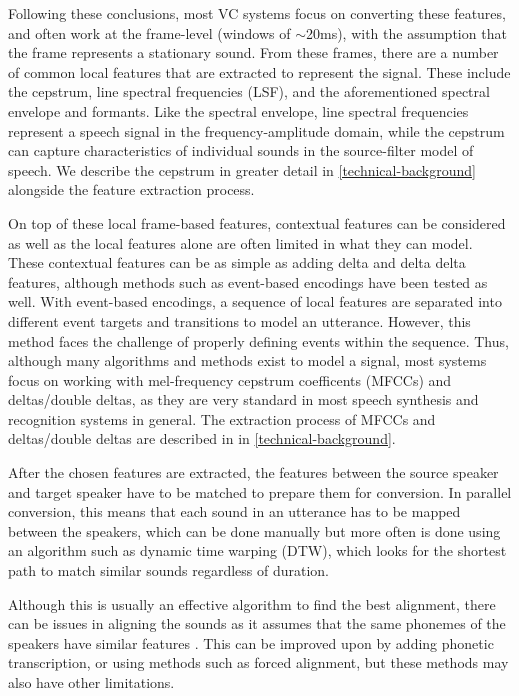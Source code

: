 \documentclass
[
    a4paper,
    twoside,
    12pt,
]
{report}
\begin{document}
Following these conclusions, most VC systems focus on converting these
features, and often work at the frame-level (windows of
\begin{math}\sim\end{math}20ms), with the assumption that the frame
represents a stationary sound. From these frames, there are a number of
common local features that are extracted to represent the signal. These
include the cepstrum, line spectral frequencies (LSF), and the
aforementioned spectral envelope and formants. Like the spectral
envelope, line spectral frequencies represent a speech signal in the
frequency-amplitude domain, while the cepstrum can capture
characteristics of individual sounds in the source-filter model of
speech. We describe the cepstrum in greater detail in
\autoref{technical-background} alongside the feature extraction process.

On top of these local frame-based features, contextual features can be
considered as well as the local features alone are often limited in what
they can model. These contextual features can be as simple as adding
delta and delta delta features, although methods such as event-based
encodings have been tested as well. With event-based encodings, a
sequence of local features are separated into different event targets
and transitions to model an utterance. However, this method faces the
challenge of properly defining events within the sequence. Thus,
although many algorithms and methods exist to model a signal, most
systems focus on working with mel-frequency cepstrum coefficents (MFCCs)
and deltas/double deltas, as they are very standard in most speech
synthesis and recognition systems in general. The extraction process of
MFCCs and deltas/double deltas are described in in
\autoref{technical-background}.

After the chosen features are extracted, the features between the source
speaker and target speaker have to be matched to prepare them for
conversion. In parallel conversion, this means that each sound in an
utterance has to be mapped between the speakers, which can be done
manually but more often is done using an algorithm such as dynamic time
warping (DTW), which looks for the shortest path to match similar sounds
regardless of duration.

Although this is usually an effective algorithm to find the best
alignment, there can be issues in aligning the sounds as it assumes that
the same phonemes of the speakers have similar features
\parencite{mohammadi2017}. This can be improved upon by adding phonetic
transcription, or using methods such as forced alignment, but these
methods may also have other limitations.
\end{document}
